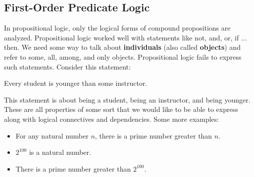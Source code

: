 \documentclass[english, 11pt]{article}
\begin{document}
  \subsection{First-Order Predicate Logic}

  In propositional logic, only the logical forms of compound propositions are analyzed. Propositional logic worked well with statements like not, and, or, if ... then. We need some way to talk about \textbf{individuals} (also called \textbf{objects}) and refer to some, all, among, and only objects. Propositional logic fails to express such statements. Consider this statement:
  \begin{center}
    Every student is younger than some instructor.
  \end{center}
  This statement is about being a student, being an instructor, and being younger. These are all properties of some sort that we would like to be able to express along with logical connectives and dependencies. Some more examples:
  \begin{itemize}
    \item For any natural number $n$, there is a prime number greater than $n$.
    \item $2^{100}$ is a natural number.
    \item There is a prime number greater than $2^{100}$.
  \end{itemize}
\end{document}
